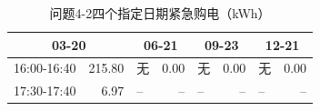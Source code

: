 \begin{table}[H]\centering\small\caption{问题4-2四个指定日期紧急购电（kWh）}\label{tab:q4_2e}
\begin{tabular}{lrlrlrlr}\toprule
\multicolumn{2}{c}{03-20} & \multicolumn{2}{c}{06-21} & \multicolumn{2}{c}{09-23} & \multicolumn{2}{c}{12-21}\\\midrule
16:00-16:40 & 215.80 & 无 & 0.00 & 无 & 0.00 & 无 & 0.00\\
17:30-17:40 & 6.97 & -- & -- & -- & -- & -- & --\\
\bottomrule\end{tabular}\end{table}
